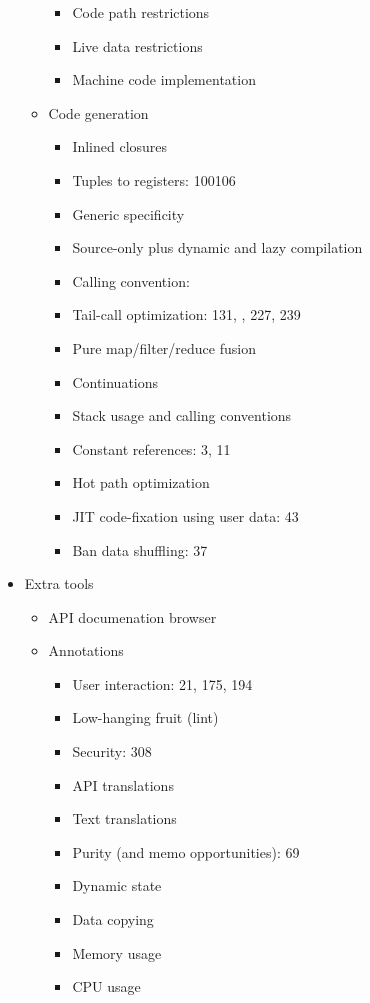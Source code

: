 \begin{itemize}
\begin{itemize}
\begin{itemize}
    \item Code path restrictions
    \item Live data restrictions
    \item Machine code implementation
    \end{itemize}
  \item Code generation
    \begin{itemize}
    \item Inlined closures
    \item Tuples to registers: 100106
    \item Generic specificity
    \item Source-only plus dynamic and lazy compilation
    \item Calling convention: \cite{LTUG}
    \item Tail-call optimization: 131, \cite{LTUG}, 227, 239
    \item Pure map/filter/reduce fusion
    \item Continuations
    \item Stack usage and calling conventions
    \item Constant references: 3, 11
    \item Hot path optimization
    \item JIT code-fixation using user data: 43
    \item Ban data shuffling: 37
    \end{itemize}
  \end{itemize}
\item Extra tools
  \begin{itemize}
  \item API documenation browser
  \item Annotations
    \begin{itemize}
    \item User interaction: 21, 175, 194
    \item Low-hanging fruit (lint)
    \item Security: 308
    \item API translations
    \item Text translations
    \item Purity (and memo opportunities): 69
    \item Dynamic state
    \item Data copying
    \item Memory usage
    \item CPU usage

\end{itemize}
\end{itemize}
\end{itemize}
